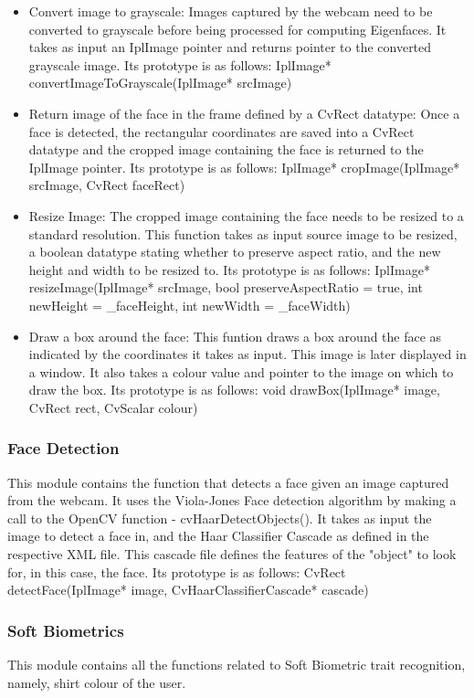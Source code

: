 \documentclass[12pt]{article}			%
\begin{document}
\begin{itemize}
\item Convert image to grayscale: Images captured by the webcam need to be converted to grayscale before being processed for computing Eigenfaces. It takes as input an IplImage pointer and returns pointer to the converted grayscale image. Its prototype is as follows:
IplImage* convertImageToGrayscale(IplImage* srcImage)
\item Return image of the face in the frame defined by a CvRect datatype: Once a face is detected, the rectangular coordinates are saved into a CvRect datatype and the cropped image containing the face is returned to the IplImage pointer. Its prototype is as follows:
IplImage* cropImage(IplImage* srcImage, CvRect faceRect)
\item Resize Image: The cropped image containing the face needs to be resized to a standard resolution. This function takes as input source image to be resized, a boolean datatype stating whether to preserve aspect ratio, and the new height and width to be resized to. Its prototype is as follows:
IplImage* resizeImage(IplImage* srcImage, bool preserveAspectRatio = true, int newHeight = _faceHeight, int newWidth = _faceWidth)
\item Draw a box around the face: This funtion draws a box around the face as indicated by the coordinates it takes as input. This image is later displayed in a window. It also takes a colour value and pointer to the image on which to draw the box. Its prototype is as follows:
void drawBox(IplImage* image, CvRect rect, CvScalar colour)
\end{itemize}

\subsubsection { Face Detection }
This module contains the function that detects a face given an image captured from the webcam. It uses the Viola-Jones Face detection algorithm by making a call to the OpenCV function - cvHaarDetectObjects(). It takes as input the image to detect a face in, and the Haar Classifier Cascade as defined in the respective XML file. This cascade file defines the features of the "object" to look for, in this case, the face. Its prototype is as follows:
CvRect detectFace(IplImage* image, CvHaarClassifierCascade* cascade)

\subsubsection { Soft Biometrics }
This module contains all the functions related to Soft Biometric trait recognition, namely, shirt colour of the user.
\end{document}
